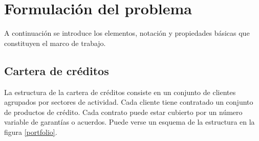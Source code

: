 
%
%
%
%
%
%
%
%

\chapter{Formulaci\'on del problema}
\label{sec:formulation}

\begin{center}
\end{center}

A continuaci\'on se introduce los elementos, notaci\'on y propiedades 
b\'asicas que constituyen el marco de trabajo.


\section{Cartera de cr\'editos}

La estructura de la cartera de cr\'editos consiste en un conjunto de
clientes agrupados por sectores de actividad. Cada cliente tiene contratado 
un conjunto de productos de cr\'edito. Cada contrato puede estar 
cubierto por un n\'umero variable de garant\'ias o acuerdos.
Puede verse un esquema de la estructura en la figura \ref{portfolio}.

